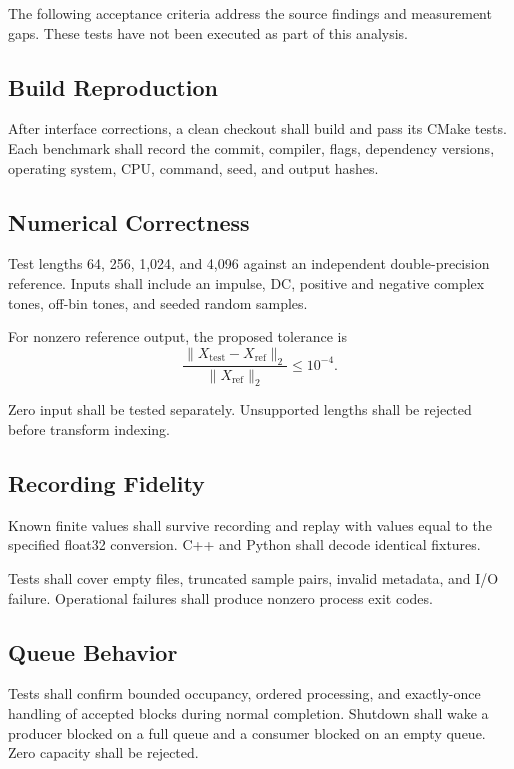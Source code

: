\documentclass[conference]{IEEEtran}
\begin{document}
The following acceptance criteria address the source
findings and measurement gaps. These tests have not been
executed as part of this analysis.

\subsection{Build Reproduction}

After interface corrections, a clean checkout shall build
and pass its CMake tests. Each benchmark shall record the
commit, compiler, flags, dependency versions, operating
system, CPU, command, seed, and output hashes.

\subsection{Numerical Correctness}

Test lengths 64, 256, 1,024, and 4,096 against an independent
double-precision reference. Inputs shall include an impulse,
DC, positive and negative complex tones, off-bin tones,
and seeded random samples.

For nonzero reference output, the proposed tolerance is
\begin{equation}
\frac{\|X_{\mathrm{test}}-X_{\mathrm{ref}}\|_2}
{\|X_{\mathrm{ref}}\|_2}\leq10^{-4}.
\end{equation}

Zero input shall be tested separately. Unsupported lengths
shall be rejected before transform indexing.

\subsection{Recording Fidelity}

Known finite values shall survive recording and replay
with values equal to the specified float32 conversion.
C++ and Python shall decode identical fixtures.

Tests shall cover empty files, truncated sample pairs,
invalid metadata, and I/O failure. Operational failures
shall produce nonzero process exit codes.

\subsection{Queue Behavior}

Tests shall confirm bounded occupancy, ordered processing,
and exactly-once handling of accepted blocks during normal
completion. Shutdown shall wake a producer blocked on a full
queue and a consumer blocked on an empty queue.
Zero capacity shall be rejected.
\end{document}
